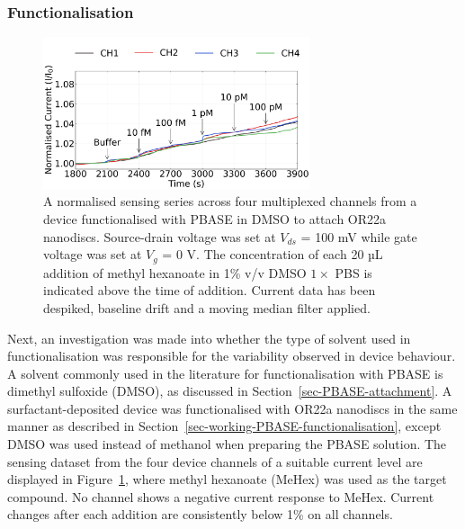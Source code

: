 \documentclass[
  a4paper,
]{scrbook}
\begin{document}
\hypertarget{functionalisation}{%
\subsubsection*{Functionalisation}\label{functionalisation}}

\begin{figure}

{\centering \includegraphics[width=0.7\textwidth,height=\textheight]{figures/ch8/NTQ25C10_OR22a_sample_220208_filtered_detrend_trunc_arrows_normalised.png}

}

\caption{\label{fig-DMSO-sensing}A normalised sensing series across four
multiplexed channels from a device functionalised with PBASE in DMSO to
attach OR22a nanodiscs. Source-drain voltage was set at \(V_{ds}\) = 100
mV while gate voltage was set at \(V_g\) = 0 V. The concentration of
each 20 µL addition of methyl hexanoate in 1\% v/v DMSO \(1 \times\) PBS
is indicated above the time of addition. Current data has been despiked,
baseline drift and a moving median filter applied.}

\end{figure}

Next, an investigation was made into whether the type of solvent used in
functionalisation was responsible for the variability observed in device
behaviour. A solvent commonly used in the literature for
functionalisation with PBASE is dimethyl sulfoxide (DMSO), as discussed
in Section~\ref{sec-PBASE-attachment}. A surfactant-deposited device was
functionalised with OR22a nanodiscs in the same manner as described in
Section~\ref{sec-working-PBASE-functionalisation}, except DMSO was used
instead of methanol when preparing the PBASE solution. The sensing
dataset from the four device channels of a suitable current level are
displayed in Figure~\ref{fig-DMSO-sensing}, where methyl hexanoate
(MeHex) was used as the target compound. No channel shows a negative
current response to MeHex. Current changes after each addition are
consistently below 1\% on all channels.
\end{document}
